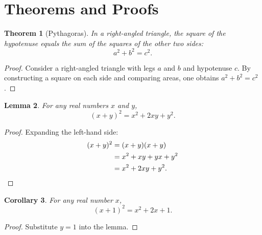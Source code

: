 \documentclass[12pt, a4paper]{article}
\newtheorem{theorem}{Theorem}
\newtheorem{lemma}[theorem]{Lemma}
\newtheorem{corollary}[theorem]{Corollary}
\begin{document}
\section*{Theorems and Proofs}

\begin{theorem}[Pythagoras]
In a right-angled triangle, the square of the hypotenuse equals the
sum of the squares of the other two sides:
\[
  a^2 + b^2 = c^2.
\]
\end{theorem}

\begin{proof}
Consider a right-angled triangle with legs \(a\) and \(b\) and
hypotenuse \(c\). By constructing a square on each side and comparing
areas, one obtains \(a^2 + b^2 = c^2\).
\end{proof}

\begin{lemma}
For any real numbers \(x\) and \(y\),
\[
  (x + y)^2 = x^2 + 2xy + y^2.
\]
\end{lemma}

\begin{proof}
Expanding the left-hand side:
\begin{align*}
  (x + y)^2 &= (x + y)(x + y) \\
            &= x^2 + xy + yx + y^2 \\
            &= x^2 + 2xy + y^2. \qedhere
\end{align*}
\end{proof}

\begin{corollary}
For any real number \(x\),
\[
  (x + 1)^2 = x^2 + 2x + 1.
\]
\end{corollary}

\begin{proof}
Substitute \(y = 1\) into the lemma.
\end{proof}
\end{document}
